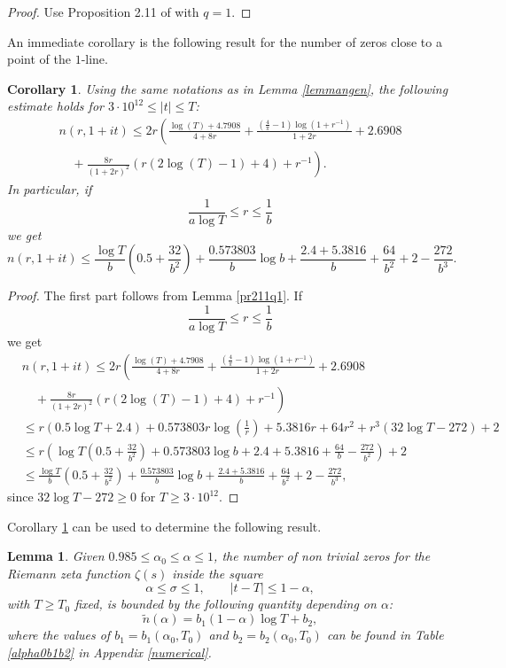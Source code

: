 \documentclass[reqno]{amsart}
\newtheorem{lemma}[theorem]{Lemma}
\newtheorem{corollary}[theorem]{Corollary}
\numberwithin{equation}{section}
\theoremstyle{remark}
\begin{document}
\begin{proof}
    Use Proposition 2.11 of \cite{thorner2023explicit} with $q=1$.
    \end{proof}
    An immediate corollary is the following result for the number of zeros close to a point of the $1$-line.
    \begin{corollary}\label{boundnear1torner}Using the same notations as in Lemma \ref{lemmangen}, the following estimate holds for $3\cdot 10^{12}\le |t| \leq T$:
        $$
\begin{aligned}
n(r, 1+i t) \leq 2 r\left(\frac{\log ( T)+4.7908}{4+8 r}+\frac{\left(\frac{4}{\pi}-1\right) \log \left(1+r^{-1}\right)}{1+2 r}+2.6908\right. \\
\left.\quad+\frac{8 r}{(1+2 r)^2}(r(2 \log (T)-1)+4)+r^{-1}\right) .
\end{aligned}
$$In particular, if $$\frac{1}{a\log T}\le r\le \frac{1}{b}$$ we get
\[
n(r, 1+i t)\le \frac{\log T}{b}\left(0.5+\frac{32}{b^2}\right)+\frac{0.573803}{b}\log b+\frac{2.4+5.3816}{b}+\frac{64}{b^2}+2-\frac{272}{b^3}.
\]
    \end{corollary}
    \begin{proof}
    The first part follows from Lemma \ref{pr211q1}.
        If $$\frac{1}{a\log T}\le r\le \frac{1}{b}$$we get
        \begin{equation*}
            \begin{aligned}
&n(r, 1+i t) \leq 2 r\left(\frac{\log ( T)+4.7908}{4+8 r}+\frac{\left(\frac{4}{\pi}-1\right) \log \left(1+r^{-1}\right)}{1+2 r}+2.6908\right. \\&
\left.\quad+\frac{8 r}{(1+2 r)^2}(r(2 \log (T)-1)+4)+r^{-1}\right) \\&\le r(0.5\log T+2.4)+0.573803 r\log\left(\frac{1}{r}\right)+
5.3816r+64 r^2 + r^3 (32 \log T - 272)+2\\&\le r\left( \log T\left(0.5+\frac{32}{b^2}\right)+0.573803\log b+2.4+5.3816+\frac{64}{b}-\frac{272}{b^2}\right)+2\\&\le \frac{\log T}{b}\left(0.5+\frac{32}{b^2}\right)+\frac{0.573803}{b}\log b+\frac{2.4+5.3816}{b}+\frac{64}{b^2}+2-\frac{272}{b^3}, \end{aligned}
        \end{equation*}
        since $32\log T-272\ge 0$ for $T\ge 3\cdot 10^{12}$.
       
    \end{proof}
    Corollary \ref{boundnear1torner} can be used to determine the following result.
\begin{lemma}\label{numberzerosinintervalwithno2}
    Given $0.985\le \alpha_0\le\alpha\le 1$, the number of non trivial zeros for the Riemann zeta function $\zeta(s)$ inside the square \[
\alpha\le \sigma\le 1,\qquad |t-T|\le 1-\alpha,
\]
with $T\ge T_0$ fixed, is bounded by the following quantity depending on $\alpha$:
 \[\tilde{n}(\alpha)=b_1(1-\alpha)\log T+b_2,\]
 where the values of $b_1=b_1(\alpha_0,T_0)$ and $b_2=b_2(\alpha_0,T_0)$ can be found in Table \ref{alpha0b1b2} in Appendix \ref{numerical}.
\end{lemma}
\end{document}

